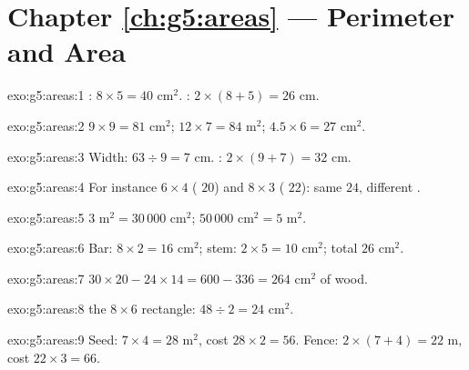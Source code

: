 \section*{Chapter \ref{ch:g5:areas} --- Perimeter and Area}

\begin{solution}{exo:g5:areas:1}
: $8 \times 5 = 40$ cm$^2$. :
$2 \times (8 + 5) = 26$ cm.
\end{solution}

\begin{solution}{exo:g5:areas:2}
$9 \times 9 = 81$ cm$^2$; \quad $12 \times 7 = 84$ m$^2$; \quad
$4.5 \times 6 = 27$ cm$^2$.
\end{solution}

\begin{solution}{exo:g5:areas:3}
Width: $63 \div 9 = 7$ cm. : $2 \times (9 + 7) = 32$ cm.
\end{solution}

\begin{solution}{exo:g5:areas:4}
For instance $6 \times 4$ ( $20$) and $8 \times 3$
( $22$): same  $24$, different .
\end{solution}

\begin{solution}{exo:g5:areas:5}
$3$ m$^2 = 30\,000$ cm$^2$; \quad $50\,000$ cm$^2 = 5$ m$^2$.
\end{solution}

\begin{solution}{exo:g5:areas:6}
Bar: $8 \times 2 = 16$ cm$^2$; stem: $2 \times 5 = 10$ cm$^2$;
total $26$ cm$^2$.
\end{solution}

\begin{solution}{exo:g5:areas:7}
$30 \times 20 - 24 \times 14 = 600 - 336 = 264$ cm$^2$ of wood.
\end{solution}

\begin{solution}{exo:g5:areas:8}
 the $8 \times 6$ rectangle: $48 \div 2 = 24$ cm$^2$.
\end{solution}

\begin{solution}{exo:g5:areas:9}
Seed:  $7 \times 4 = 28$ m$^2$, cost $28 \times 2 = 56$.
Fence:  $2 \times (7 + 4) = 22$ m, cost
$22 \times 3 = 66$.
\end{solution}

